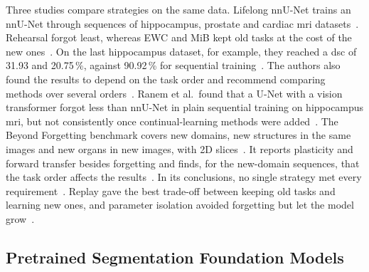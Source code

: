 Three studies compare strategies on the same data.
Lifelong nnU-Net trains an nnU-Net through sequences of hippocampus, prostate and cardiac \gls{mri} datasets~\cite{gonzalez2023lifelong}.
Rehearsal forgot least, whereas EWC and MiB kept old tasks at the cost of the new ones~\cite{gonzalez2023lifelong}.
On the last hippocampus dataset, for example, they reached a \gls{dsc} of 31.93 and 20.75\,\%, against 90.92\,\% for sequential training~\cite{gonzalez2023lifelong}.
The authors also found the results to depend on the task order and recommend comparing methods over several orders~\cite{gonzalez2023lifelong}.
Ranem et al.\ found that a U-Net with a vision transformer forgot less than nnU-Net in plain sequential training on hippocampus \gls{mri}, but not consistently once continual-learning methods were added~\cite{ranem2022continualhippocampussegmentationtransformers}.
The Beyond Forgetting benchmark covers new domains, new structures in the same images and new organs in new images, with 2D slices~\cite{wang2026beyondforgetting}.
It reports plasticity and forward transfer besides forgetting and finds, for the new-domain sequences, that the task order affects the results~\cite{wang2026beyondforgetting}.
In its conclusions, no single strategy met every requirement~\cite{wang2026beyondforgetting}.
Replay gave the best trade-off between keeping old tasks and learning new ones, and parameter isolation avoided forgetting but let the model grow~\cite{wang2026beyondforgetting}.

\subsection{Pretrained Segmentation Foundation Models}
\label{subsec:cl-medseg-fm}

